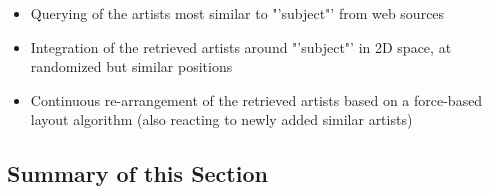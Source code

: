 \begin{itemize}
	\item Querying of the artists most similar to "'subject"' from web sources
	\item Integration of the retrieved artists around "'subject"' in 2D space, at randomized but similar positions
	\item Continuous re-arrangement of the retrieved artists based on a force-based layout algorithm (also reacting to newly added similar artists)
\end{itemize}

\subsection{Summary of this Section}